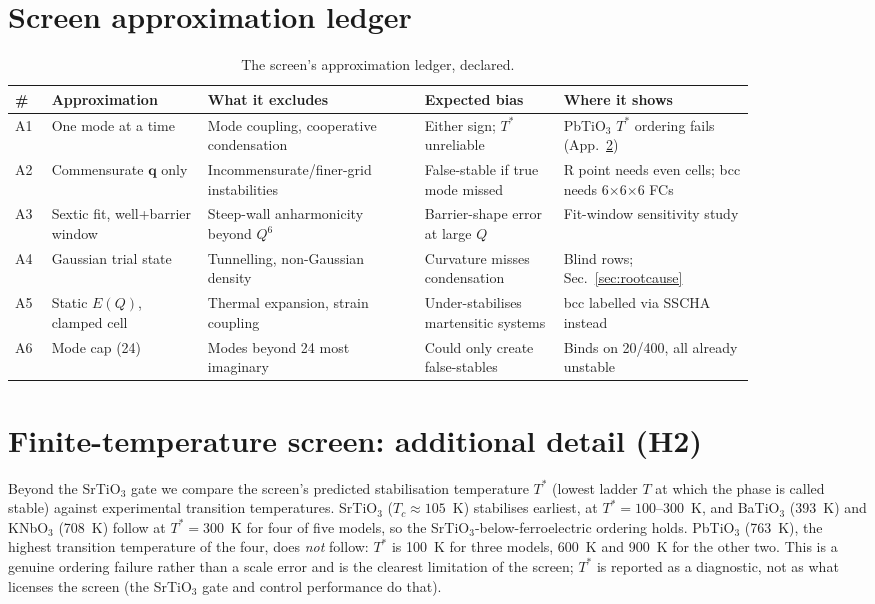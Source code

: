 \documentclass{article}
\begin{document}
\section{Screen approximation ledger}
\label{app:approx}
\begin{table}[h]
\centering
\scriptsize
\begin{tabular}{L{0.045\linewidth}L{0.185\linewidth}L{0.255\linewidth}L{0.16\linewidth}L{0.22\linewidth}}
\toprule
\# & Approximation & What it excludes & Expected bias & Where it shows \\
\midrule
A1 & One mode at a time & Mode coupling, cooperative condensation & Either sign; $T^*$ unreliable & PbTiO$_3$ $T^*$ ordering fails (App.~\ref{app:h2-detail}) \\
A2 & Commensurate $\mathbf{q}$ only & Incommensurate/finer-grid instabilities & False-stable if true mode missed & R point needs even cells; bcc needs 6$\times$6$\times$6 FCs \\
A3 & Sextic fit, well+barrier window & Steep-wall anharmonicity beyond $Q^6$ & Barrier-shape error at large $Q$ & Fit-window sensitivity study \\
A4 & Gaussian trial state & Tunnelling, non-Gaussian density & Curvature misses condensation & Blind rows; Sec.~\ref{sec:rootcause} \\
A5 & Static $E(Q)$, clamped cell & Thermal expansion, strain coupling & Under-stabilises martensitic systems & bcc labelled via SSCHA instead \\
A6 & Mode cap (24) & Modes beyond 24 most imaginary & Could only create false-stables & Binds on 20/400, all already unstable \\
\bottomrule
\end{tabular}
\caption{The screen's approximation ledger, declared.}
\end{table}

\section{Finite-temperature screen: additional detail (H2)}
\label{app:h2-detail}
Beyond the SrTiO$_3$ gate we compare the screen's predicted stabilisation temperature $T^*$ (lowest ladder $T$ at which the phase is called stable) against experimental transition temperatures. SrTiO$_3$ ($T_c\approx105$~K) stabilises earliest, at $T^*=100$--300~K, and BaTiO$_3$ (393~K) and KNbO$_3$ (708~K) follow at $T^*=300$~K for four of five models, so the SrTiO$_3$-below-ferroelectric ordering holds. PbTiO$_3$ (763~K), the highest transition temperature of the four, does \emph{not} follow: $T^*$ is 100~K for three models, 600~K and 900~K for the other two. This is a genuine ordering failure rather than a scale error and is the clearest limitation of the screen; $T^*$ is reported as a diagnostic, not as what licenses the screen (the SrTiO$_3$ gate and control performance do that).
\end{document}
